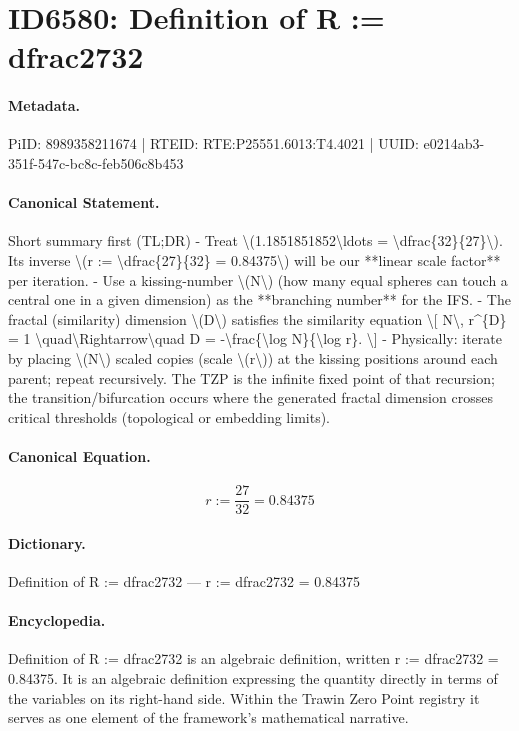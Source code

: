\section*{ID6580: Definition of R := dfrac2732}
\paragraph{Metadata.}
PiID: 8989358211674 | RTEID: RTE:P25551.6013:T4.4021 | UUID: e0214ab3-351f-547c-bc8c-feb506c8b453

\paragraph{Canonical Statement.}
Short summary first (TL;DR) - Treat \textbackslash{}(1.1851851852\textbackslash{}ldots = \textbackslash{}dfrac\{32\}\{27\}\textbackslash{}). Its inverse \textbackslash{}(r := \textbackslash{}dfrac\{27\}\{32\} = 0.84375\textbackslash{}) will be our **linear scale factor** per iteration. - Use a kissing-number \textbackslash{}(N\textbackslash{}) (how many equal spheres can touch a central one in a given dimension) as the **branching number** for the IFS. - The fractal (similarity) dimension \textbackslash{}(D\textbackslash{}) satisfies the similarity equation \textbackslash{}[ N\textbackslash{}, r\textasciicircum{}\{D\} = 1 \textbackslash{}quad\textbackslash{}Rightarrow\textbackslash{}quad D = -\textbackslash{}frac\{\textbackslash{}log N\}\{\textbackslash{}log r\}. \textbackslash{}] - Physically: iterate by placing \textbackslash{}(N\textbackslash{}) scaled copies (scale \textbackslash{}(r\textbackslash{})) at the kissing positions around each parent; repeat recursively. The TZP is the infinite fixed point of that recursion; the transition/bifurcation occurs where the generated fractal dimension crosses critical thresholds (topological or embedding limits).

\paragraph{Canonical Equation.}
\[
r := \dfrac{27}{32} = 0.84375
\]

\paragraph{Dictionary.}
Definition of R := dfrac2732 — r := dfrac2732 = 0.84375

\paragraph{Encyclopedia.}
Definition of R := dfrac2732 is an algebraic definition, written r := dfrac2732 = 0.84375. It is an algebraic definition expressing the quantity directly in terms of the variables on its right-hand side. Within the Trawin Zero Point registry it serves as one element of the framework's mathematical narrative.
